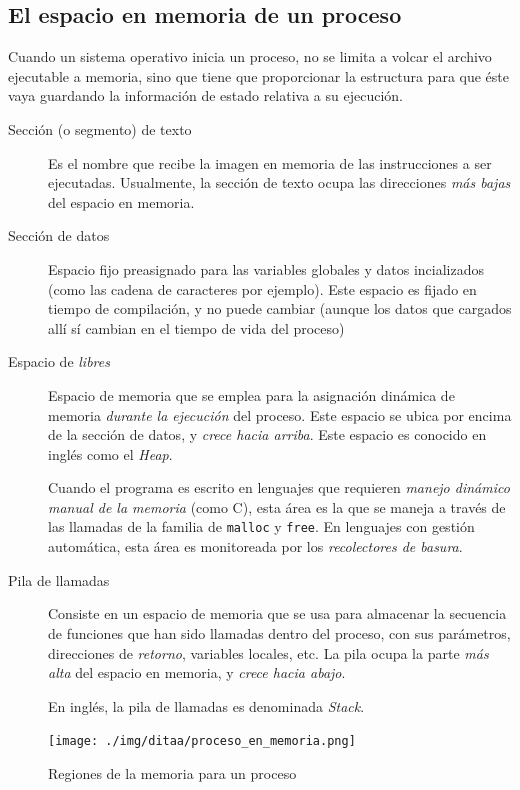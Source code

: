 \documentclass[11pt,fleqn]{book} %
\begin{document}
\subsection{El espacio en memoria de un proceso}
\label{sec-5-1-4}
\label{MEM_espacio_en_memoria}


Cuando un sistema operativo inicia un proceso, no se limita a volcar
el archivo ejecutable a memoria, sino que tiene que proporcionar la
estructura para que éste vaya guardando la información de estado
relativa a su ejecución.

\begin{description}
\item[Sección (o segmento) de texto] Es el nombre que recibe la imagen en memoria de
     las instrucciones a ser ejecutadas. Usualmente, la sección de
     texto ocupa las direcciones \emph{más bajas} del espacio en memoria.
\item[Sección de datos] Espacio fijo preasignado para las variables
     globales y datos incializados (como las cadena de caracteres por ejemplo). 
     Este espacio es fijado en tiempo de compilación, y no
     puede cambiar (aunque los datos que cargados allí sí cambian en el tiempo
     de vida del proceso)
\item[Espacio de \emph{libres}] Espacio de memoria que se emplea
     para la asignación dinámica de memoria \emph{durante la ejecución} del
     proceso. Este espacio se ubica por encima de la sección de datos,
     y \emph{crece hacia arriba}. Este espacio es conocido en inglés como
     el \emph{Heap}.

     Cuando el programa es escrito en lenguajes que requieren \emph{manejo      dinámico manual de la memoria} (como C), esta área es la que se maneja a
     través de las llamadas de la familia de \texttt{malloc} y \texttt{free}. En
     lenguajes con gestión automática, esta área es monitoreada por
     los \emph{recolectores de basura}.
\item[Pila de llamadas] Consiste en un espacio de memoria que se usa para
     almacenar la secuencia de funciones que han sido llamadas dentro 
     del proceso, con sus parámetros, direcciones de \emph{retorno}, 
     variables locales, etc. La pila ocupa la parte \emph{más alta} del 
     espacio en memoria, y \emph{crece hacia abajo}.

     En inglés, la pila de llamadas es denominada \emph{Stack}.
\end{description}

\begin{figure}[htb]
\centering
\texttt{[image: ./img/ditaa/proceso\_en\_memoria.png]}
\caption{\label{MEM_proceso_en_memoria}Regiones de la memoria para un proceso}
\end{figure}
\end{document}

